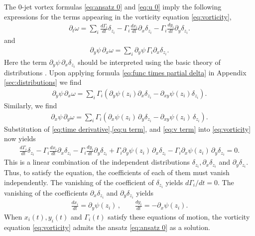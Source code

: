 \documentclass[12pt]{amsart}
\theoremstyle{remark}
\begin{document}
The 0-jet vortex formulas \eqref{eq:ansatz 0} and \eqref{eq:u 0} imply the following expressions for the terms appearing in the vorticity equation \eqref{eq:vorticity},
\begin{align}
  \partial_t \omega = \sum_{i} \frac{d \Gamma_i}{dt} \delta_{z_i} 
  - \Gamma_i \frac{dx_i}{dt} \partial_x \delta_{z_i}
  - \Gamma_i \frac{dy_i}{dt} \partial_y \delta_{z_i}.
  \label{eq:time derivative}
\end{align}
and
\begin{align*}
  \partial_y \psi \, \partial_x \omega = \sum_{i} \partial_y \psi \, \Gamma_i \partial_x \delta_{z_i}.
\end{align*}
Here the term $\partial_y \psi \, \partial_x \delta_{z_i}$ should be interpreted
using the basic theory of distributions \cite{Hormander2003}.
Upon applying formula \eqref{eq:func times partial delta} in Appendix
\ref{sec:distributions} we find
\begin{align}
  \partial_y\psi \, \partial_x \omega = \sum_{i} \Gamma_i \left( \partial_y \psi(z_i) \partial_x \delta_{z_i} - \partial_{xy} \psi (z_i) \delta_{z_i} \right). \label{eq:u term}
\end{align}
Similarly, we find
\begin{align}
   \partial_x\psi \, \partial_y \omega = \sum_{i} \Gamma_i \left( \partial_x \psi (z_i) \, \partial_y \delta_{z_i} - \partial_{xy}\psi (z_i) \, \delta_{z_i} \right). \label{eq:v term}
\end{align}
Substitution of \eqref{eq:time derivative},\eqref{eq:u term},
and \eqref{eq:v term} into \eqref{eq:vorticity} now yields
\begin{align*}
\frac{d \Gamma_i}{dt} \delta_{z_i} 
  - \Gamma_i \frac{dx_i}{dt} \partial_x \delta_{z_i}
  - \Gamma_i \frac{dy_i}{dt} \partial_y \delta_{z_i}
  + \Gamma_i \partial_y \psi(z_i)\, \partial_x \delta_{z_i} - \Gamma_i \partial_x \psi(z_i)\, \partial_y \delta_{z_i} =  0.
\end{align*}
This is a linear combination of the independent distributions $\delta_{z_i},\partial_x\delta_{z_i}$ and $\partial_y \delta_{z_i}$.
Thus, to satisfy the equation, the coefficients of each of them must vanish independently.
The vanishing of the coefficient of $\delta_{z_i}$ yields $d\Gamma_i / dt = 0$.
The vanishing of the coefficients $\partial_x \delta_{z_i}$ and $\partial_y \delta_{z_i}$ yields
\begin{align}
  \frac{dx_i}{dt} = \partial_y \psi (z_i) \,,\quad  \quad \frac{dy_i}{dt} = - \partial_x \psi(z_i).
  \label{eq:point motion}
\end{align}
When $x_i(t),y_i(t)$ and $\Gamma_i(t)$ satisfy these equations of motion, the vorticity equation \eqref{eq:vorticity} admits the ansatz \eqref{eq:ansatz 0} as a solution.
\end{document}
